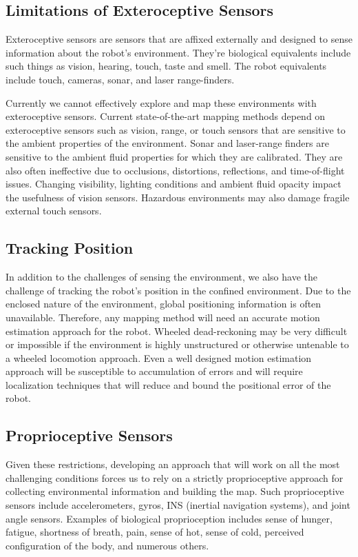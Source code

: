 \subsection{Limitations of Exteroceptive Sensors}
\label{limitationsofexteroceptivesensors}

Exteroceptive sensors are sensors that are affixed externally and designed to sense information about the robot's environment. They're biological equivalents include such things as vision, hearing, touch, taste and smell. The robot equivalents include touch, cameras, sonar, and laser range-finders.

Currently we cannot effectively explore and map these environments with exteroceptive sensors. Current state-of-the-art mapping methods depend on exteroceptive sensors such as vision, range, or touch sensors that are sensitive to the ambient properties of the environment. Sonar and laser-range finders are sensitive to the ambient fluid properties for which they are calibrated. They are also often ineffective due to occlusions, distortions, reflections, and time-of-flight issues. Changing visibility, lighting conditions and ambient fluid opacity impact the usefulness of vision sensors. Hazardous environments may also damage fragile external touch sensors.

\subsection{Tracking Position}
\label{trackingposition}

In addition to the challenges of sensing the environment, we also have the challenge of tracking the robot's position in the confined environment. Due to the enclosed nature of the environment, global positioning information is often unavailable. Therefore, any mapping method will need an accurate motion estimation approach for the robot. Wheeled dead-reckoning may be very difficult or impossible if the environment is highly unstructured or otherwise untenable to a wheeled locomotion approach. Even a well designed motion estimation approach will be susceptible to accumulation of errors and will require localization techniques that will reduce and bound the positional error of the robot.

\subsection{Proprioceptive Sensors}
\label{proprioceptivesensors}

Given these restrictions, developing an approach that will work on all the most challenging conditions forces us to rely on a strictly proprioceptive approach for collecting environmental information and building the map. Such proprioceptive sensors include accelerometers, gyros, INS (inertial navigation systems), and joint angle sensors. Examples of biological proprioception includes sense of hunger, fatigue, shortness of breath, pain, sense of hot, sense of cold, perceived configuration of the body, and numerous others.

